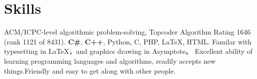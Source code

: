 \documentclass[10pt]{moderncv}   %
\begin{document}
\section{Skills}
       {ACM/ICPC-level algorithmic problem-solving, Topcoder Algorithm Rating 1646 (rank 1121 of 8431).}
       {\textbf{C\#}, \textbf{C++}, Python, C, PHP, \LaTeX, HTML.} %
       {Familar with typesetting in \LaTeX，and graphics drawing in Asymptote。}
       {Excellent ability of learning programming languages and algorithms, readily accepts new things.\newline{}Friendly and easy to get along with other people.}
\end{document}
